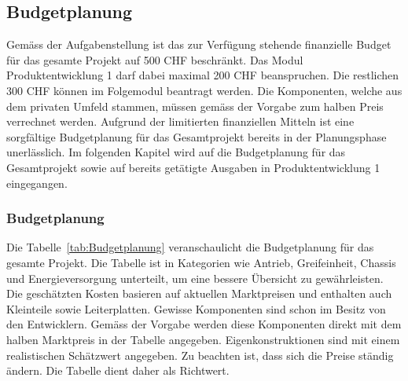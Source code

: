 \documentclass[main.tex]{subfiles} %
\begin{document}

\subsection{Budgetplanung}

Gemäss der Aufgabenstellung ist das zur Verfügung stehende finanzielle Budget 
für das gesamte Projekt
auf 500 CHF beschränkt. Das Modul Produktentwicklung 1 darf dabei maximal 200 CHF
beanspruchen. Die restlichen 300 CHF können im Folgemodul beantragt werden. 
Die Komponenten, welche aus dem privaten Umfeld stammen, 
müssen gemäss der Vorgabe zum halben Preis verrechnet werden. Aufgrund der limitierten 
finanziellen Mitteln ist eine sorgfältige Budgetplanung für das Gesamtprojekt bereits in
der Planungsphase unerlässlich. Im folgenden Kapitel 
wird auf die Budgetplanung für das Gesamtprojekt sowie auf bereits getätigte Ausgaben in
Produktentwicklung 1 eingegangen.

\subsubsection*{Budgetplanung}
Die Tabelle~\ref{tab:Budgetplanung} veranschaulicht die Budgetplanung für das 
gesamte Projekt. Die Tabelle ist in Kategorien wie Antrieb, Greifeinheit, 
Chassis und Energieversorgung unterteilt, um eine bessere Übersicht zu gewährleisten. 
Die geschätzten Kosten basieren auf aktuellen Marktpreisen und enthalten auch 
Kleinteile sowie Leiterplatten. Gewisse Komponenten sind schon im Besitz von den
Entwicklern. Gemäss der Vorgabe werden diese Komponenten direkt mit dem halben
Marktpreis in der Tabelle angegeben. Eigenkonstruktionen sind mit einem realistischen 
Schätzwert angegeben. Zu beachten ist, dass sich die Preise ständig ändern. Die 
Tabelle dient daher als Richtwert.\\


\newpage
\end{document}
